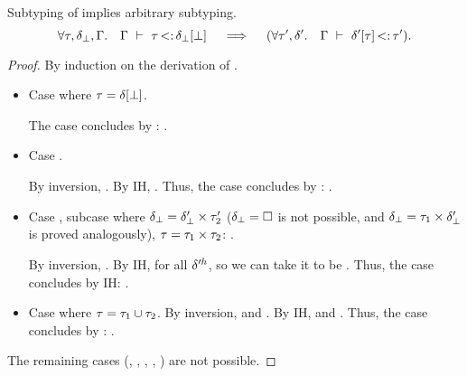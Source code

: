 \begin{lemma}{Subtyping of \tybot implies arbitrary subtyping.}\label{lem:sub-of-bot}
    \[
    \forall \tau, \delta_{\bot}, \Gamma.\quad 
    \Gamma\ \vdash\ \tau \operatorname{<:} \delta_{\bot}[\bot]
    \quad\implies\quad
    (\forall \tau', \delta'.\quad \Gamma\ \vdash\ \delta'[\tau] \operatorname{<:} \tau').
    \]
\end{lemma}
\begin{proof}
    By induction on the derivation of 
    \subtydflt{\ty}{\plug{\dctx_{\tybot}}\tybot}.
    \begin{itemize}
        \item Case 
            \subtydflt{\plug\dctx\tybot}{\plug{\dctx_{\tybot}}{\tybot}}
            where $\tau = \delta[\bot]$.

            The case concludes by :
            . 
        \item Case 
            \subtydflt{\plug\dctx\vany}{\plug{\dctx_{\tybot}}{\tybot}}.

            By inversion, \subtydflt{\plug\dctx\tyub}{\plug{\dctx_{\tybot}}{\tybot}}.
            By IH, .
            Thus, the case concludes by : 
            .
        \item Case , subcase where
            $\delta_{\bot} = \delta'_{\bot} \times \tau'_2$
            ($\delta_{\bot} = \square$ is not possible, and
            $\delta_{\bot} = \tau_1 \times \delta'_{\bot}$
            is proved analogously),
            $\tau = \tau_1 \times \tau_2$:
            {}.

            By inversion, .
            By IH,  for all $\delta'^h$,
            so we can take it to be .
            Thus, the case concludes by IH: 
            .
        \item Case 
            where $\tau = \tau_1 \cup \tau_2$.
            By inversion, 
             and
            .
            By IH,  and
            .
            Thus, the case concludes by : 
            .
    \end{itemize}
    The remaining cases 
    (, , , , ) 
    are not possible.
\end{proof}

